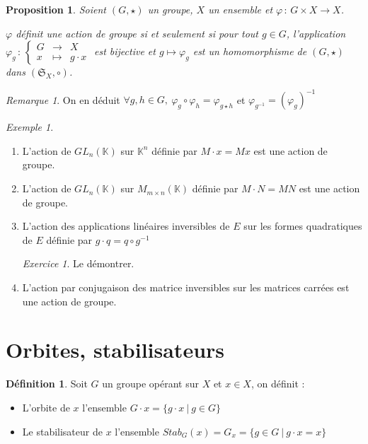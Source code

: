\documentclass[]{article}
\newtheorem{myproposition}{Proposition}
\theoremstyle{remark}
\newtheorem{myrem}{Remarque}
\newtheorem{myexer}{Exercice}
\newtheorem{myexmpl}{Exemple}
\theoremstyle{definition}
\newtheorem{mydef}{Définition}
\newcommand{\func}[5]{
#1 \, : \, \left\{ \begin{array}{lcl}
	#2 & \longrightarrow & #3 \\
	#4 & \longmapsto & #5
\end{array}
\right.
}
\newcommand{\funcshort}[3]{
#1 \, : \, #2 \longrightarrow #3
}
\begin{document}
\begin{myproposition}
	Soient $(G, \star)$ un groupe, $X$ un ensemble et $\funcshort{\varphi}{G \times X}{X}$.
	
	$\varphi$ définit une action de groupe si et seulement si pour tout $g \in G$, l'application $\func{\varphi_g}{G}{X}{x}{g \cdot x}$ est bijective et $g\longmapsto \varphi_g$ est un homomorphisme de $(G, \star)$ dans $(\mathfrak{S}_X, \circ)$.
\end{myproposition}

\begin{myrem}
	On en déduit $\forall g, h \in G, ~ \varphi_g \circ \varphi_h = \varphi_{g \star h}$ et $\varphi_{g^{-1}}=(\varphi_g)^{-1}$
\end{myrem}

\begin{myexmpl}
	\begin{enumerate}
		\item L'action de $GL_n(\mathbb{K})$ sur $\mathbb{K}^n$ définie par $M\cdot x=Mx$ est une action de groupe.
	
		\item L'action de $GL_n(\mathbb{K})$ sur $M_{m \times n}(\mathbb{K})$ définie par $M \cdot N=MN$ est une action de groupe.
				
		\item L'action des applications linéaires inversibles de $E$ sur les formes quadratiques de $E$ définie par $g \cdot q = q \circ g^{-1}$
		
		\begin{myexer}
			Le démontrer.
		\end{myexer}
		
		\item L'action par conjugaison des matrice inversibles sur les matrices carrées est une action de groupe.
	\end{enumerate}
\end{myexmpl}

\section{Orbites, stabilisateurs}

\begin{mydef}
	Soit $G$ un groupe opérant sur $X$ et $x \in X$, on définit :
	
	\begin{itemize}
		\item L'orbite de $x$ l'ensemble $G \cdot x=\{g\cdot x ~ | ~ g \in G\}$
		
		\item Le stabilisateur de $x$ l'ensemble $Stab_G(x)=G_x = \{g \in G ~ | ~ g \cdot x = x\}$
	\end{itemize}
\end{mydef}
\end{document}
